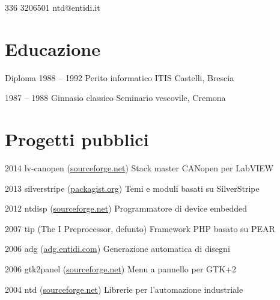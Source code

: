 \documentclass[fontsize=10pt]{tccv}
\begin{document}
    {336 3206501}
    {ntd@entidi.it}

\section{Educazione}

\begin{yearlist}

\item[Diploma]{1988 -- 1992}
     {Perito informatico}
     {ITIS Castelli, Brescia}

\item{1987 -- 1988}
     {Ginnasio classico}
     {Seminario vescovile, Cremona}

\end{yearlist}

\section{Progetti pubblici}

\begin{yearlist}

\item{2014}
     {lv-canopen (\href{https://sourceforge.net/projects/lv-canopen/}{sourceforge.net})}
     {Stack master CANopen per LabVIEW}

\item{2013}
     {silverstripe (\href{https://packagist.org/packages/entidi/}{packagist.org})}
     {Temi e moduli basati su SilverStripe}

\item{2012}
     {ntdisp (\href{https://sourceforge.net/projects/ntdisp/}{sourceforge.net})}
     {Programmatore di device embedded}

\item{2007}
     {tip (The I Preprocessor, defunto)}
     {Framework PHP basato su PEAR}

\item{2006}
     {adg (\href{https://adg.entidi.com/}{adg.entidi.com})}
     {Generazione automatica di disegni}

\item{2006}
     {gtk2panel (\href{https://sourceforge.net/projects/gtk2panel/}{sourceforge.net})}
     {Menu a pannello per GTK+2}

\item{2004}
     {ntd (\href{https://sourceforge.net/projects/ntd/}{sourceforge.net})}
     {Librerie per l'automazione industriale}

\end{yearlist}
\end{document}
